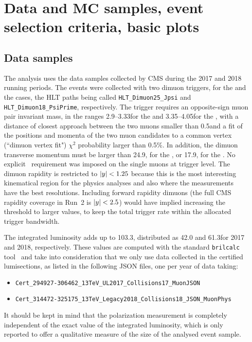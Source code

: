 \section{Data and MC samples, event selection criteria, basic plots}
\label{sec:samples}

\subsection{Data samples}
\label{sec:datasamples}

The analysis uses the data samples collected by CMS during the 2017 and 2018 running periods.
The events were collected with
two dimuon triggers, for the \jpsi and the \psip cases,
the HLT paths being called {\tt HLT\_Dimuon25\_Jpsi} and {\tt HLT\_Dimuon18\_PsiPrime}, 
respectively.
%
The trigger requires an opposite-sign muon pair invariant mass, 
in the ranges 2.9--3.33\GeV for the \jpsi and 3.35--4.05\GeV for the \psip,
with a distance of closest approach between the two muons smaller than 0.5\cm and
a fit of the positions and momenta of the two muon candidates to a common vertex
(``dimuon vertex fit") $\chi^2$ probability larger than 0.5\%.
In addition, the dimuon transverse momentum must be 
larger than 24.9\GeV, for the \jpsi, or 17.9\GeV, for the \psip.
No explicit \pt\ requirement was imposed on the single muons at trigger level.
The dimuon rapidity is restricted to $\abs{y} < 1.25$ because this is the most 
interesting kinematical region for the physics analyses and also where the 
measurements have the best resolutions.
Including forward rapidity dimuons 
(the full CMS rapidity coverage in Run~2 is $\abs{y} < 2.5$)
would have implied increasing the \pt threshold to larger values,
to keep the total trigger rate within the allocated trigger bandwidth.

The integrated luminosity adds up to 103.3\fbinv, 
distributed as 42.0 and 61.3\fbinv for 2017 and 2018, respectively.
These values are computed with the standard \texttt{brilcalc} tool~\cite{bib:brilcalc}
and take into consideration that we only use data collected in the certified lumisections,
as listed in the following JSON files, one per year of data taking:
\begin{itemize}
\item \texttt{Cert\_294927-306462\_13TeV\_UL2017\_Collisions17\_MuonJSON}
\item \texttt{Cert\_314472-325175\_13TeV\_Legacy2018\_Collisions18\_JSON\_MuonPhys}
\end{itemize}
It should be kept in mind that the polarization measurement is completely 
independent of the exact value of the integrated luminosity, which is only
reported to offer a qualitative measure of the size of the analysed event sample.

